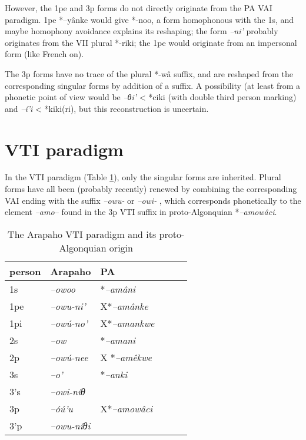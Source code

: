 \documentclass[twoside,a4paper,11pt]{article}
\newcommand{\ipa}[1]{{\phon\textit{#1}}}
\newcommand{\Σ}{\greek{Σ}}
\begin{document}
However, the 1pe and 3p forms do not directly originate from the PA VAI paradigm. 1pe *--yânke would give *-noo, a form homophonous with the 1s, and maybe homophony avoidance explains its reshaping; the  form  	\ipa{--ni'} probably originates from the VII plural *-riki; the 1pe would originate from an impersonal form (like French on).

The 3p forms have no trace of the plural *-wâ suffix, and are reshaped from the corresponding singular forms by addition of  a suffix. A possibility (at least from a phonetic point of view would be \ipa{--θi'} < *ciki (with double third person marking) and  	\ipa{--í'i} < *kiki(ri), but this reconstruction is uncertain.

\section{VTI paradigm}

In the VTI paradigm (Table \ref{tab:vti}), only the singular forms are inherited. Plural forms have all been (probably recently) renewed by combining the corresponding VAI ending with the suffix \ipa{--owu-} or \ipa{--owi-} , which corresponds phonetically to the element \ipa{--amo--} found in the 3p VTI suffix in proto-Algonquian 	*\ipa{--amowâci}.
\begin{table}[H]
\caption{The Arapaho VTI paradigm and its proto-Algonquian origin}
\centering \label{tab:vti}
\begin{tabular}{llllll}
\toprule
person & Arapaho & PA\\
\midrule
1s & 					\ipa{--owoo} & 	*\ipa{--amâni} & 	\\	
1pe & 					\ipa{--owu-ni'} & 	X*\ipa{--amânke} & 	\\	
1pi & 					\ipa{--owú-no'} & 	X*\ipa{--amankwe} & 	\\	
\midrule
2s & 					\ipa{--ow} & 	*\ipa{--amani} & 	\\	
2p & 					\ipa{--owú-nee} & X	*\ipa{--amêkwe} & 	\\	
\midrule
3s & 					\ipa{--o'} & 	*\ipa{--anki} & 	\\	
3's & 					\ipa{--owi-níθ} &   & 	\\
3p & 					\ipa{--óú'u} &   	X*\ipa{--amowâci} 	\\	
3'p & 					\ipa{--owu-níθi} & 	  & 	\\	
\bottomrule
\end{tabular}
\end{table}
\end{document}
